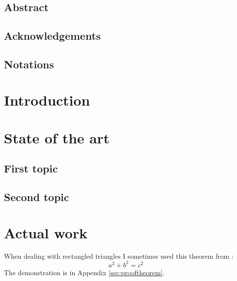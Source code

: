 \documentclass{thesisreport}
\begin{document}
   
 
  \section*{Abstract}
 
 
 \newpage
 
 \section*{Acknowledgements}
 
 \newpage
 
 
 \section*{Notations}
 
 \newpage
 
 
 
 \tableofcontents
 
 
 \chapter*{Introduction}
 
 
 \chapter{State of the art}
 
 \section{First topic}
 
 \section{Second topic}
 
 \chapter{Actual work}
 
 When dealing with rectangled triangles I sometimes used this theorem from \cite{pythm001}:
 \begin{equation}\label{theo}
  a^2 + b^2 = c^2
 \end{equation}The demonstration is in Appendix \ref{sec:prooftheorem}.

 
 
\end{document}
